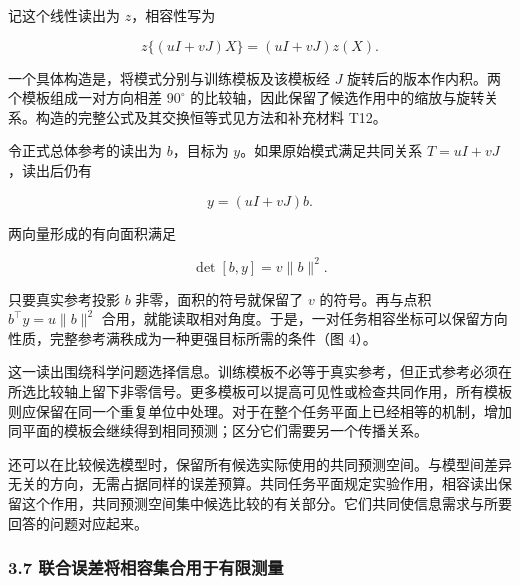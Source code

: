 \documentclass[11pt,a4paper]{article}
\begin{document}
\par
\noindent\begin{minipage}{\linewidth}

记这个线性读出为 \(z\)，相容性写为

\[
z\{(uI+vJ)X\}=(uI+vJ)z(X).
\]

\end{minipage}\par

一个具体构造是，将模式分别与训练模板及该模板经 \(J\)
旋转后的版本作内积。两个模板组成一对方向相差 \(90^\circ\)
的比较轴，因此保留了候选作用中的缩放与旋转关系。构造的完整公式及其交换恒等式见方法和补充材料
T12。

\par
\noindent\begin{minipage}{\linewidth}

令正式总体参考的读出为 \(b\)，目标为 \(y\)。如果原始模式满足共同关系
\(T=uI+vJ\)，读出后仍有

\[
y=(uI+vJ)b.
\]

\end{minipage}\par

\par
\noindent\begin{minipage}{\linewidth}

两向量形成的有向面积满足

\[
\det[b,y]=v\|b\|^2.
\]

\end{minipage}\par

只要真实参考投影 \(b\) 非零，面积的符号就保留了 \(v\) 的符号。再与点积
\(b^\top y=u\|b\|^2\)
合用，就能读取相对角度。于是，一对任务相容坐标可以保留方向性质，完整参考满秩成为一种更强目标所需的条件（图
4）。

这一读出围绕科学问题选择信息。训练模板不必等于真实参考，但正式参考必须在所选比较轴上留下非零信号。更多模板可以提高可见性或检查共同作用，所有模板则应保留在同一个重复单位中处理。对于在整个任务平面上已经相等的机制，增加同平面的模板会继续得到相同预测；区分它们需要另一个传播关系。

还可以在比较候选模型时，保留所有候选实际使用的共同预测空间。与模型间差异无关的方向，无需占据同样的误差预算。共同任务平面规定实验作用，相容读出保留这个作用，共同预测空间集中候选比较的有关部分。它们共同使信息需求与所要回答的问题对应起来。

\subsubsection{3.7
联合误差将相容集合用于有限测量}\label{ux8054ux5408ux8befux5deeux5c06ux76f8ux5bb9ux96c6ux5408ux7528ux4e8eux6709ux9650ux6d4bux91cf}
\end{document}
